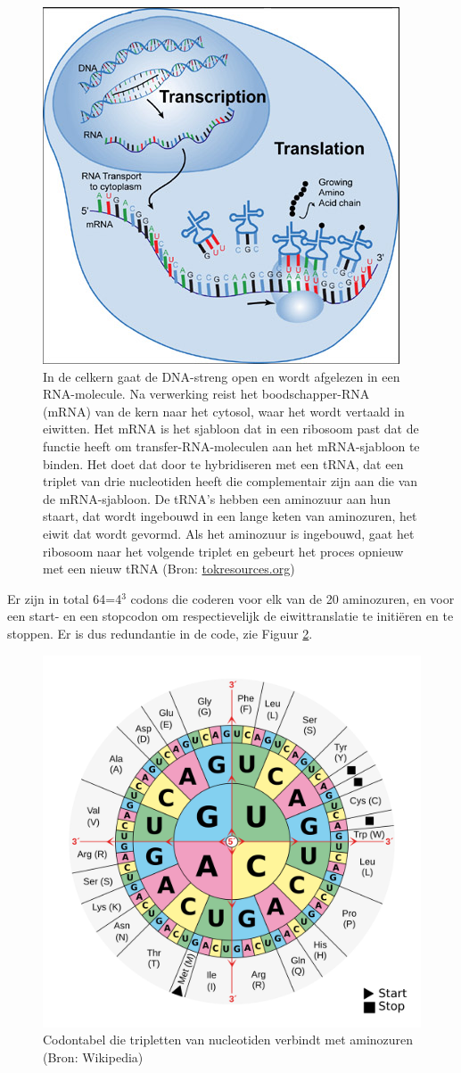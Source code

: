 \documentclass[
  11pt,
]{book}
\begin{document}
\begin{figure}

{\centering \includegraphics[width=0.5\linewidth]{./figs/transcription_2} 

}

\caption{In de celkern gaat de DNA-streng open en wordt afgelezen in een RNA-molecule. Na verwerking reist het boodschapper-RNA (mRNA) van de kern naar het cytosol, waar het wordt vertaald in eiwitten. Het mRNA is het sjabloon dat in een ribosoom past dat de functie heeft om transfer-RNA-moleculen aan het mRNA-sjabloon te binden. Het doet dat door te hybridiseren met een tRNA, dat een triplet van drie nucleotiden heeft die complementair zijn aan die van de mRNA-sjabloon. De tRNA's hebben een aminozuur aan hun staart, dat wordt ingebouwd in een lange keten van aminozuren, het eiwit dat wordt gevormd. Als het aminozuur is ingebouwd, gaat het ribosoom naar het volgende triplet en gebeurt het proces opnieuw met een nieuw tRNA (Bron: \href{http://www.tokresource.org/tok_classes/biobiobio/biomenu/transcription_translation/}{tokresources.org})}\label{fig:transcriptionTranslation}
\end{figure}

Er zijn in total 64=4\(^3\) codons die coderen voor elk van de 20 aminozuren, en voor een start- en een stopcodon om respectievelijk de eiwittranslatie te initiëren en te stoppen. Er is dus redundantie in de code, zie Figuur \ref{fig:codonTable}.

\begin{figure}

{\centering \includegraphics[width=0.5\linewidth]{./figs/Aminoacids_table} 

}

\caption{Codontabel die tripletten van nucleotiden verbindt met aminozuren (Bron: Wikipedia)}\label{fig:codonTable}
\end{figure}
\end{document}

